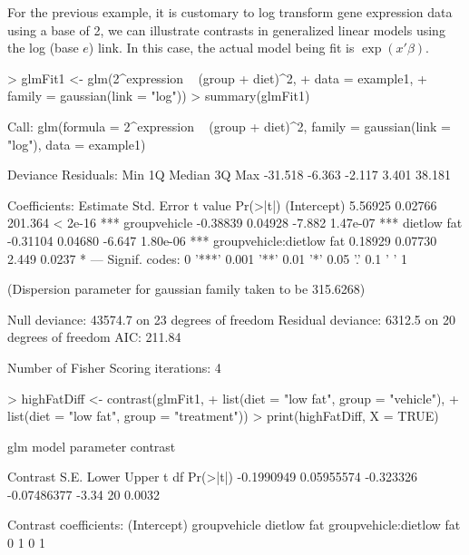 \documentclass[12pt]{article}
\renewenvironment{Schunk}{\vspace{\topsep}}{\vspace{\topsep}}
\begin{document}
For the previous example, it is customary to log transform gene expression data using a base of 2, we can illustrate contrasts in generalized linear models using the log (base $e$) link. In this case, the actual model being fit is $\exp(x'\beta)$.  
\begin{Schunk}
\begin{Sinput}
> glmFit1 <- glm(2^expression ~ (group + diet)^2, 
+                data = example1, 
+                family = gaussian(link = "log"))
> summary(glmFit1)
\end{Sinput}
\begin{Soutput}
Call:
glm(formula = 2^expression ~ (group + diet)^2, family = gaussian(link = "log"), 
    data = example1)

Deviance Residuals: 
    Min       1Q   Median       3Q      Max  
-31.518   -6.363   -2.117    3.401   38.181  

Coefficients:
                         Estimate Std. Error t value Pr(>|t|)    
(Intercept)               5.56925    0.02766 201.364  < 2e-16 ***
groupvehicle             -0.38839    0.04928  -7.882 1.47e-07 ***
dietlow fat              -0.31104    0.04680  -6.647 1.80e-06 ***
groupvehicle:dietlow fat  0.18929    0.07730   2.449   0.0237 *  
---
Signif. codes:  0 '***' 0.001 '**' 0.01 '*' 0.05 '.' 0.1 ' ' 1

(Dispersion parameter for gaussian family taken to be 315.6268)

    Null deviance: 43574.7  on 23  degrees of freedom
Residual deviance:  6312.5  on 20  degrees of freedom
AIC: 211.84

Number of Fisher Scoring iterations: 4
\end{Soutput}
\begin{Sinput}
> highFatDiff <- contrast(glmFit1, 
+                         list(diet = "low fat", group = "vehicle"),
+                         list(diet = "low fat", group = "treatment"))
> print(highFatDiff, X = TRUE)
\end{Sinput}
\begin{Soutput}
glm model parameter contrast

   Contrast       S.E.     Lower       Upper     t df Pr(>|t|)
 -0.1990949 0.05955574 -0.323326 -0.07486377 -3.34 20   0.0032

Contrast coefficients:
 (Intercept) groupvehicle dietlow fat groupvehicle:dietlow fat
           0            1           0                        1
\end{Soutput}
\end{Schunk}
\end{document}
